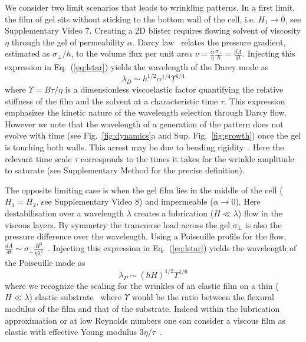 \documentclass[twocolumn,superscriptaddress,showpacs,preprintnumbers,
amsmath,amssymb,prl]{revtex4-1}
\begin{document}
We consider two limit scenarios that leads to wrinkling patterns. In a first limit, the film of gel sits without sticking to the bottom wall of the cell, i.e. $H_1\rightarrow0$, see Supplementary Video 7. Creating a 2D blister requires flowing solvent of viscosity $\eta$ through the gel of permeability $\alpha$. Darcy law~\cite{Darcy1856} relates the pressure gradient, estimated as $\sigma_{\perp}/h$, to the volume flux per unit area $v = \frac{\alpha}{\eta}\frac{\sigma_{\perp}}{h} = \frac{dA}{dt}$. Injecting this expression in Eq.~(\ref{eq:lstar}) yields the wavelength of the Darcy mode as
\begin{equation}
\lambda_D \sim h^{1/2} \alpha^{1/4} \Upsilon^{1/4}
\end{equation}
where $\Upsilon = B\tau/\eta$ is a dimensionless viscoelastic factor quantifying the relative stiffness of the film and the solvent at a characteristic time $\tau$. This expression emphasizes the kinetic nature of the wavelength selection through Darcy flow. However we note that the wavelength of a generation of the pattern does not evolve with time (see Fig.~\ref{fig:dynamics}a and Sup. Fig.~\ref{fig:growth}) once the gel is touching both walls. This arrest may be due to bending rigidity~\cite{LeGoff2014}. Here the relevant time scale $\tau$ corresponds to the times it takes for the wrinkle amplitude to saturate (see Supplementary Method for the precise definition).

The opposite limiting case is when the gel film lies in the middle of the cell ($H_1=H_2$, see Supplementary Video 8) and impermeable ($\alpha\rightarrow 0$). Here destabilisation over a wavelength $\lambda$ creates a lubrication ($H\ll\lambda$) flow in the viscous layers. By symmetry the transverse load across the gel $\sigma_{\perp}$ is also the pressure difference over the wavelength. Using a Poiseuille profile for the flow, $\frac{dA}{dt} \sim \sigma_{\perp} \frac{H^3}{\eta\lambda^2}$~\cite{Poiseuille1842}. Injecting this expression in Eq.~(\ref{eq:lstar}) yields the wavelength of the Poiseuille mode as
\begin{equation}
\lambda_P \sim (hH)^{1/2} \Upsilon^{1/6}
\end{equation}
where we recognize the scaling for the wrinkles of an elastic film on a thin ($H\ll\lambda$) elastic substrate~\cite{Cerda2003} where $\Upsilon$ would be the ratio between the flexural modulus of the film and that of the substrate. Indeed within the lubrication approximation or at low Reynolds numbers one can consider a viscous film as elastic with effective Young modulus $3\eta/\tau$~\cite{Biot1957,Boudaoud2001}.
\end{document}
